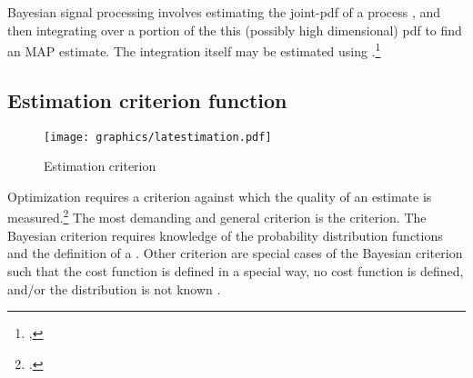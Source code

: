 Bayesian signal processing involves estimating the joint-pdf of a process ,
and then integrating over a portion of the this (possibly high dimensional) pdf to find an MAP estimate.
The integration itself may be estimated using .\footnote{
  ,
  }


\subsection{Estimation criterion function}
\label{sec:est_criterion}
\begin{figure}
\centering%
\texttt{[image: graphics/latestimation.pdf]}
\caption{
   Estimation criterion
   \label{fig:est-criterion}
   }
\end{figure}

Optimization requires a criterion against which the quality of an
estimate is measured.\footnote{.}
The most demanding and general criterion is the  criterion.
The Bayesian criterion requires knowledge of the probability
distribution functions and the definition of a .
Other criterion are special cases of the Bayesian criterion
such that the cost function is defined in a special way,
no cost function is defined, and/or the distribution is not known
.

